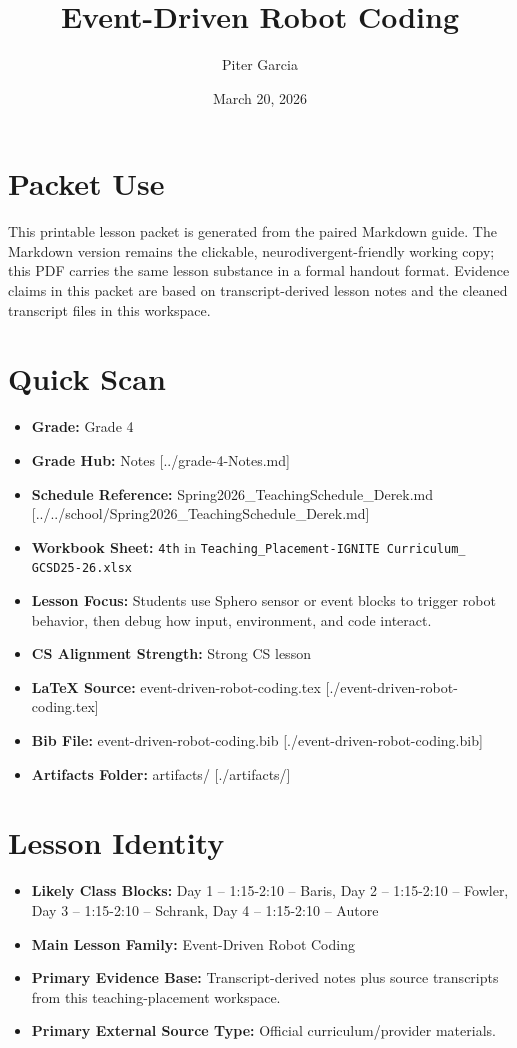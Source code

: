 \documentclass[11pt]{article}
\title{Event-Driven Robot Coding}
\author{Piter Garcia}
\date{March 20, 2026}
\begin{document}
\maketitle
\section*{Packet Use}
This printable lesson packet is generated from the paired Markdown guide. The Markdown version remains the clickable, neurodivergent-friendly working copy; this PDF carries the same lesson substance in a formal handout format. Evidence claims in this packet are based on transcript-derived lesson notes and the cleaned transcript files in this workspace.

\section*{Quick Scan}
\begin{itemize}[leftmargin=*]
\item \textbf{Grade:} Grade 4
\item \textbf{Grade Hub:} Notes [../grade-4-Notes.md]
\item \textbf{Schedule Reference:} Spring2026\_TeachingSchedule\_Derek.md [../../school/Spring2026\_TeachingSchedule\_Derek.md]
\item \textbf{Workbook Sheet:} \texttt{4th} in \texttt{Teaching\_Placement-IGNITE Curriculum\_ GCSD25-26.xlsx}
\item \textbf{Lesson Focus:} Students use Sphero sensor or event blocks to trigger robot behavior, then debug how input, environment, and code interact.
\item \textbf{CS Alignment Strength:} Strong CS lesson
\item \textbf{LaTeX Source:} event-driven-robot-coding.tex [./event-driven-robot-coding.tex]
\item \textbf{Bib File:} event-driven-robot-coding.bib [./event-driven-robot-coding.bib]
\item \textbf{Artifacts Folder:} artifacts/ [./artifacts/]
\end{itemize}

\section*{Lesson Identity}
\begin{itemize}[leftmargin=*]
\item \textbf{Likely Class Blocks:} Day 1 -- 1:15-2:10 -- Baris, Day 2 -- 1:15-2:10 -- Fowler, Day 3 -- 1:15-2:10 -- Schrank, Day 4 -- 1:15-2:10 -- Autore
\item \textbf{Main Lesson Family:} Event-Driven Robot Coding
\item \textbf{Primary Evidence Base:} Transcript-derived notes plus source transcripts from this teaching-placement workspace.
\item \textbf{Primary External Source Type:} Official curriculum/provider materials.
\end{itemize}
\end{document}
